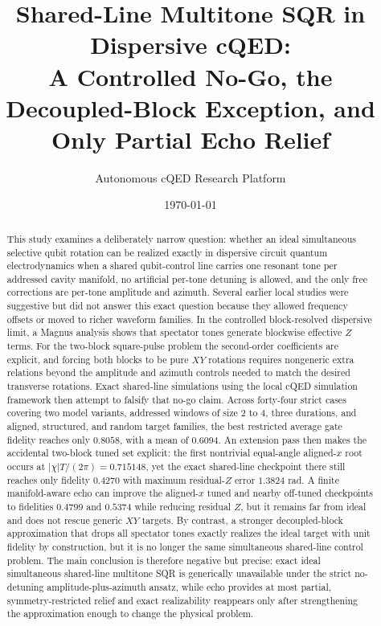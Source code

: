 \documentclass[aps,pra,twocolumn,reprint,floatfix,amsmath,amssymb]{revtex4-2}
\begin{document}
\title{\texorpdfstring{Shared-Line Multitone SQR in Dispersive cQED:\\
A Controlled No-Go, the Decoupled-Block Exception, and Only Partial Echo Relief}{Shared-Line Multitone SQR in Dispersive cQED: A Controlled No-Go, the Decoupled-Block Exception, and Only Partial Echo Relief}}
\author{Autonomous cQED Research Platform}
\date{\today}

\begin{abstract}
This study examines a deliberately narrow question: whether an ideal simultaneous selective qubit rotation can be realized exactly in dispersive circuit quantum electrodynamics when a shared qubit-control line carries one resonant tone per addressed cavity manifold, no artificial per-tone detuning is allowed, and the only free corrections are per-tone amplitude and azimuth. Several earlier local studies were suggestive but did not answer this exact question because they allowed frequency offsets or moved to richer waveform families. In the controlled block-resolved dispersive limit, a Magnus analysis shows that spectator tones generate blockwise effective \(Z\) terms. For the two-block square-pulse problem the second-order coefficients are explicit, and forcing both blocks to be pure \(XY\) rotations requires nongeneric extra relations beyond the amplitude and azimuth controls needed to match the desired transverse rotations. Exact shared-line simulations using the local cQED simulation framework then attempt to falsify that no-go claim. Across forty-four strict cases covering two model variants, addressed windows of size \(2\) to \(4\), three durations, and aligned, structured, and random target families, the best restricted average gate fidelity reaches only \(0.8058\), with a mean of \(0.6094\). An extension pass then makes the accidental two-block tuned set explicit: the first nontrivial equal-angle aligned-\(x\) root occurs at \(|\chi|T/(2\pi)=0.715148\), yet the exact shared-line checkpoint there still reaches only fidelity \(0.4270\) with maximum residual-\(Z\) error \(1.3824\) rad. A finite manifold-aware echo can improve the aligned-\(x\) tuned and nearby off-tuned checkpoints to fidelities \(0.4799\) and \(0.5374\) while reducing residual \(Z\), but it remains far from ideal and does not rescue generic \(XY\) targets. By contrast, a stronger decoupled-block approximation that drops all spectator tones exactly realizes the ideal target with unit fidelity by construction, but it is no longer the same simultaneous shared-line control problem. The main conclusion is therefore negative but precise: exact ideal simultaneous shared-line multitone SQR is generically unavailable under the strict no-detuning amplitude-plus-azimuth ansatz, while echo provides at most partial, symmetry-restricted relief and exact realizability reappears only after strengthening the approximation enough to change the physical problem.
\end{abstract}
\end{document}
